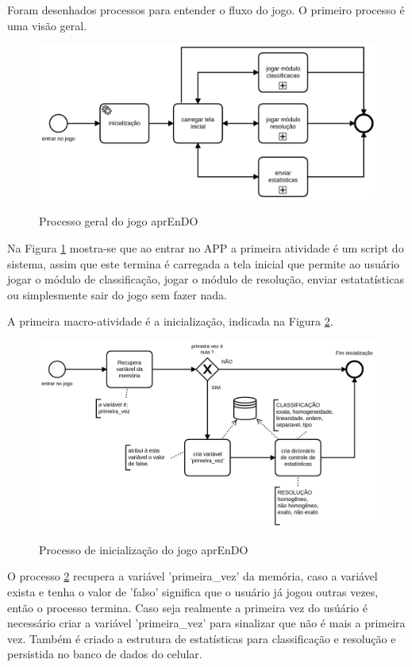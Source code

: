 Foram desenhados processos para entender o fluxo do jogo. O primeiro processo é uma visão geral.

\begin{figure}[H]
\centering
\caption{Processo geral do jogo aprEnDO}
\includegraphics[scale=0.2]{figuras/processos/processo_geral.png}
\label{pg}
\end{figure}

Na Figura \ref{pg} mostra-se que ao entrar no APP a primeira atividade é um script do sistema, assim que este termina é carregada a tela inicial que permite ao usuário jogar o módulo de classificação, jogar o módulo de resolução, enviar estatatísticas ou simplesmente sair do jogo sem fazer nada.

A primeira macro-atividade é a inicialização, indicada na Figura \ref{inic}.

\begin{figure}[H]
\centering
\caption{Processo de inicialização do jogo aprEnDO}
\includegraphics[scale=0.2]{figuras/processos/proccesso_inicializacao.png}
\label{inic}
\end{figure}

O processo \ref{inic} recupera a variável 'primeira\_vez' da memória, caso a variável exista e tenha o valor de 'falso' significa que o usuário já jogou outras vezes, então o processo termina. Caso seja realmente a primeira vez do usúário é necessário criar a variável 'primeira\_vez' para sinalizar que não é mais a primeira vez. Também é criado a estrutura de estatísticas para classificação e resolução e persistida no banco de dados do celular.


